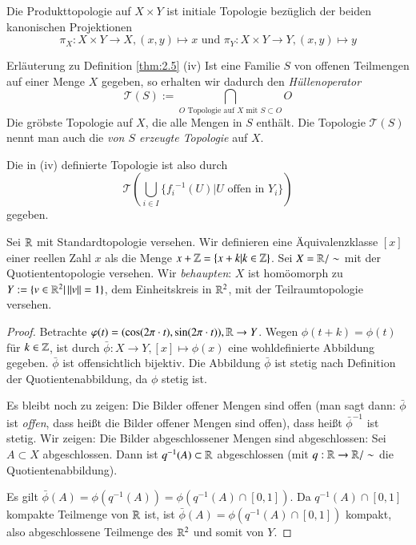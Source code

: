 \documentclass[a4paper,10pt]{scrartcl}
\begin{document}
\begin{ex*}
Die Produkttopologie auf $ X\times Y $ ist initiale Topologie bezüglich der beiden kanonischen Projektionen
\[
\pi_X:X\times Y \to X, (x,y)\mapsto x \text{ und } \pi_Y: X\times Y\to Y, (x,y)\mapsto y 
\]
\end{ex*}
\begin{seg}{Erläuterung zu Definition \ref{thm:2.5} (iv)} 
Ist eine Familie $ S $ von offenen Teilmengen auf einer Menge $ X $ gegeben, so erhalten wir dadurch den \emph{Hüllenoperator} 
\[ 
\mathcal T(S):=\bigcap\limits_{ O \text{ Topologie auf } X \text{ mit } S\subset O} O 
\]
Die gröbste Topologie auf $ X $, die alle Mengen in $ S $ enthält. Die Topologie $ \mathcal T(S) $ nennt man auch die \emph{von $ S $ erzeugte Topologie} auf $ X $.
\end{seg}
Die in (iv) definierte Topologie ist also durch
\[
\mathcal T(\bigcup\limits_{i\in I} \{ {f_i}^{-1}(U)|U \text{ offen in } Y_i\} )
\]
gegeben.
\begin{ex}\label{thm:2.6} Sei $ \mathbb{R} $ mit Standardtopologie versehen. Wir definieren eine Äquivalenzklasse $ [x] $ einer reellen Zahl $ x $ als die Menge $x+\mathbb{Z}=\{x+k|k\in \mathbb{Z}\}$. Sei $ X=\mathbb{R}/\sim $ mit der Quotiententopologie versehen. Wir \emph{behaupten}: $ X $ ist homöomorph zu $ Y:=\{v\in \mathbb{R}^2|\, ||v||=1\} $, dem Einheitskreis in $ \mathbb{R}^2 $, mit der Teilraumtopologie versehen. 
\begin{figure}[H]
\centering

\caption{}
\end{figure}
\begin{proof}
Betrachte $ \varphi(t)=(\cos(2\pi\cdot t),\sin(2\pi \cdot t)), \mathbb{R}\to Y $.
Wegen $ \phi(t+k)=\phi(t) $ für $ k\in \mathbb{Z} $, ist durch $ \bar\phi: X\to Y, [x]\mapsto \phi(x) $ eine wohldefinierte Abbildung gegeben. $\bar \phi$ ist offensichtlich bijektiv. Die Abbildung $ \bar \phi  $ ist stetig nach Definition der Quotientenabbildung, da $ \phi $ stetig ist.

Es bleibt noch zu zeigen: Die Bilder offener Mengen sind offen (man sagt dann: $ \bar \phi $ ist \emph{offen}, dass heißt die Bilder offener Mengen sind offen), dass heißt $ \bar \phi^{-1} $ ist stetig. Wir zeigen: Die Bilder abgeschlossener Mengen sind abgeschlossen: Sei $ A\subset X $ abgeschlossen. Dann ist $ q^{-1}(A)\subset \mathbb{R} $ abgeschlossen (mit $ q: \mathbb{R} \to \mathbb{R}/\sim $ die Quotientenabbildung).

Es gilt $ \bar \phi(A)=\phi(q^{-1}(A))=\phi(q^{-1}(A)\cap[0,1]) $. Da $ q^{-1}(A)\cap [0,1] $ kompakte Teilmenge von $ \mathbb{R} $ ist, ist $ \bar\phi(A)=\phi(q^{-1}(A)\cap[0,1]) $ kompakt, also abgeschlossene Teilmenge des $ \mathbb{R}^2  $ und somit von $ Y $.
\end{proof}
\end{ex}
\end{document}
